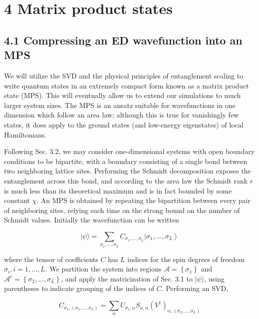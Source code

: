 \documentclass[12pt]{article}
\begin{document}
\section*{4 Matrix product states}
\subsection*{4.1 Compressing an ED wavefunction into an MPS}
We will utilize the SVD and the physical principles of entanglement scaling to write quantum states in an extremely compact form known as a matrix product state (MPS). This will eventually allow us to extend our simulations to much larger system sizes. The MPS is an ansatz suitable for wavefunctions in one dimension which follow an area law; although this is true for vanishingly few states, it does apply to the ground states (and low-energy eigenstates) of local Hamiltonians.

Following Sec. 3.2, we may consider one-dimensional systems with open boundary conditions to be bipartite, with a boundary consisting of a single bond between two neighboring lattice sites. Performing the Schmidt decomposition exposes the entanglement across this bond, and according to the area law the Schmidt rank $r$ is much less than its theoretical maximum and is in fact bounded by some constant $\chi$. An MPS is obtained by repeating the bipartition between every pair of neighboring sites, relying each time on the strong bound on the number of Schmidt values. Initially the wavefunction can be written


\begin{equation*}
|\psi\rangle=\sum_{\sigma_{1}, \ldots, \sigma_{L}} C_{\sigma_{1}, \ldots, \sigma_{L}}\left|\sigma_{1}, \ldots, \sigma_{L}\right\rangle \tag{11}
\end{equation*}


where the tensor of coefficients $C$ has $L$ indices for the spin degrees of freedom $\sigma_{i}, i=1, \ldots, L$. We partition the system into regions $\mathcal{A}=\left\{\sigma_{1}\right\}$ and $\mathcal{A}^{c}=\left\{\sigma_{2}, \ldots, \sigma_{L}\right\}$, and apply the matricization of Sec. 3.1 to $|\psi\rangle$, using parentheses to indicate grouping of the indices of $C$. Performing an SVD,


\begin{equation*}
C_{\sigma_{1},\left(\sigma_{2}, \ldots, \sigma_{L}\right)}=\sum_{\alpha} U_{\sigma_{1}, \alpha} S_{\alpha, \alpha}\left(V^{\dagger}\right)_{\alpha,\left(\sigma_{2}, \ldots, \sigma_{L}\right)} \tag{12}
\end{equation*}
\end{document}

